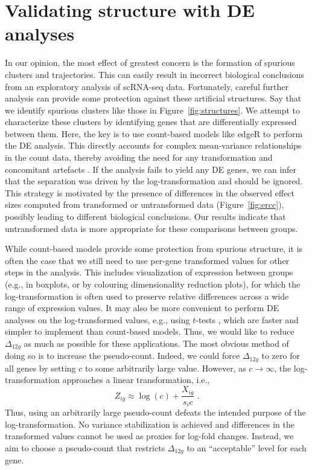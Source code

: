 \documentclass[10pt,letterpaper]{article}
\begin{document}
\section{Validating structure with DE analyses}
In our opinion, the most effect of greatest concern is the formation of spurious clusters and trajectories.
This can easily result in incorrect biological conclusions from an exploratory analysis of scRNA-seq data.
Fortunately, careful further analysis can provide some protection against these artificial structures.
Say that we identify spurious clusters like those in Figure~\ref{fig:structures}.
We attempt to characterize these clusters by identifying genes that are differentially expressed between them.
Here, the key is to use count-based models like edgeR \cite{robinson2010edgeR} to perform the DE analysis.
This directly accounts for complex mean-variance relationships in the count data, thereby avoiding the need for any transformation and concomitant artefacts \cite{ohara2010do}.
If the analysis fails to yield any DE genes, we can infer that the separation was driven by the log-transformation and should be ignored.
This strategy is motivated by the presence of differences in the observed effect sizes computed from transformed or untransformed data (Figure~\ref{fig:ercc}), possibly leading to different biological conclusions.
Our results indicate that untransformed data is more appropriate for these comparisons between groups.

While count-based models provide some protection from spurious structure, it is often the case that we still need to use per-gene transformed values for other steps in the analysis.
This includes visualization of expression between groups (e.g., in boxplots, or by colouring dimensionality reduction plots), for which the log-transformation is often used to preserve relative differences across a wide range of expression values.
It may also be more convenient to perform DE analyses on the log-transformed values, e.g., using $t$-tests \cite{law2014voom,soneson2018bias}, which are faster and simpler to implement than count-based models.
Thus, we would like to reduce $\Delta_{12g}$ as much as possible for these applications.
The most obvious method of doing so is to increase the pseudo-count.
Indeed, we could force $\Delta_{12g}$ to zero for all genes by setting $c$ to some arbitrarily large value.
However, as $c \to \infty$, the log-transformation approaches a linear transformation, i.e.,
\[
    Z_{ig} \approx \log(c) + \frac{X_{ig}}{s_i c} \;.
\]
Thus, using an arbitrarily large pseudo-count defeats the intended purpose of the log-transformation. 
No variance stabilization is achieved and differences in the transformed values cannot be used as proxies for log-fold changes. 
Instead, we aim to choose a pseudo-count that restricts $\Delta_{12g}$ to an ``acceptable'' level for each gene.
\end{document}
